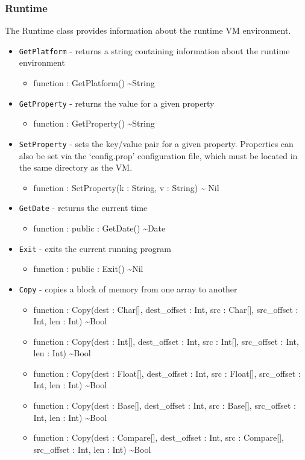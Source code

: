 \documentclass[11pt]{article}
\begin{document}
\subsubsection{Runtime}
The Runtime class provides information about the runtime VM
environment.
\begin{itemize}
\item \texttt{GetPlatform} - returns a string containing information
  about the runtime environment
  \begin{itemize}
  \item function : GetPlatform() \textasciitilde String
  \end{itemize}
\item \texttt{GetProperty} - returns the value for a given property
  \begin{itemize}
  \item function : GetProperty() \textasciitilde String
  \end{itemize}
\item \texttt{SetProperty} - sets the key/value pair for a given
  property. Properties can also be set via the `config.prop'
  configuration file, which must be located in the same directory as
  the VM.
  \begin{itemize}
  \item function : SetProperty(k : String, v : String) \textasciitilde
    Nil
  \end{itemize}
\item \texttt{GetDate} - returns the current time
  \begin{itemize}
  \item function : public : GetDate() \textasciitilde Date
  \end{itemize}
\item \texttt{Exit} - exits the current running program
  \begin{itemize}
  \item function : public : Exit() \textasciitilde Nil
  \end{itemize}
\item \texttt{Copy} - copies a block of memory from one array to
  another
  \begin{itemize}
  \item function : Copy(dest : Char[], dest\_offset : Int, src :
    Char[], src\_offset : Int, len : Int) \textasciitilde Bool
  \item function : Copy(dest : Int[], dest\_offset : Int, src : Int[],
    src\_offset : Int, len : Int) \textasciitilde Bool
  \item function : Copy(dest : Float[], dest\_offset : Int, src :
    Float[], src\_offset : Int, len : Int) \textasciitilde Bool
  \item function : Copy(dest : Base[], dest\_offset : Int, src :
    Base[], src\_offset : Int, len : Int) \textasciitilde Bool
  \item function : Copy(dest : Compare[], dest\_offset : Int, src :
    Compare[], src\_offset : Int, len : Int) \textasciitilde Bool
  \end{itemize}
\end{itemize}
\end{document}
